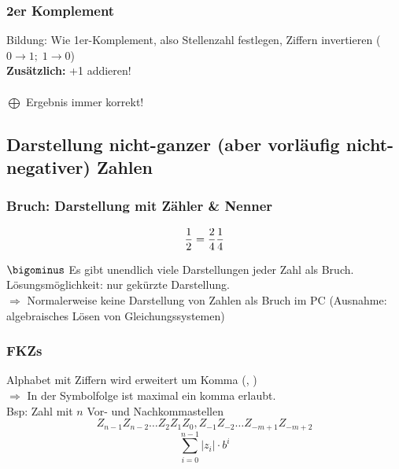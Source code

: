 \documentclass[10pt,a4paper]{scrartcl}
\begin{document}
\subsubsection{2er Komplement}
Bildung: Wie 1er-Komplement, also Stellenzahl festlegen, Ziffern invertieren ($ 0 \rightarrow 1; \; 1\rightarrow 0 $)\\
\textbf{Zusätzlich:} +1 addieren!\\
\\
$ \bigoplus $ Ergebnis immer korrekt!

\subsection{Darstellung nicht-ganzer (aber vorläufig nicht-negativer) Zahlen}
\subsubsection{Bruch: Darstellung mit Zähler \& Nenner}
$$
\dfrac{1}{2} = \dfrac{2}{4} \\
\dfrac{1}{4}
$$

$ \bigominus $ Es gibt unendlich viele Darstellungen jeder Zahl als Bruch. Lösungsmöglichkeit: nur gekürzte Darstellung.\\
$ \Rightarrow $ Normalerweise keine Darstellung von Zahlen als Bruch im PC (Ausnahme: algebraisches Lösen von Gleichungssystemen)

\subsubsection{\acp{FKZ}}
Alphabet mit Ziffern wird erweitert um \glqq Komma \grqq (\glqq , \grqq)\\
$ \Rightarrow $ In der Symbolfolge ist maximal ein komma erlaubt. \\
Bsp: Zahl mit $n$ Vor- und Nachkommastellen
$$
Z_{n-1} Z_{n-2}\ldots Z_2 Z_1 Z_0,Z_{-1} Z_{-2} \ldots Z_{-m+1} Z_{-m+2}
$$
$$
\sum_{i=0}^{n-1} |z_i|\cdot b^i
$$
\end{document}
